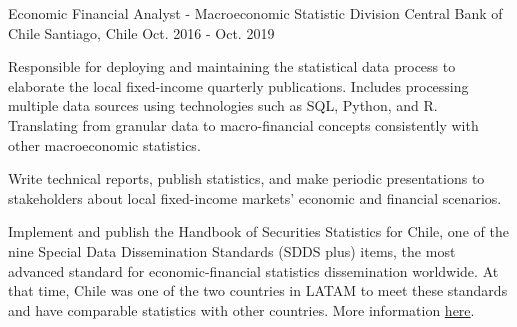\begin{cventries}
  \cventry
    {Economic Financial Analyst - Macroeconomic Statistic Division} %
    {Central Bank of Chile} %
    {Santiago, Chile} %
    {Oct. 2016 - Oct. 2019} %
    {
      \begin{cvitems} %
        \item {Responsible for deploying and maintaining the statistical data process to elaborate the local fixed-income quarterly publications. Includes processing multiple data sources using technologies such as SQL, Python, and R. Translating from granular data to macro-financial concepts consistently with other macroeconomic statistics.}
        \item {Write technical reports, publish statistics, and make periodic presentations to stakeholders about local fixed-income markets' economic and financial scenarios.}
        \item {Implement and publish the Handbook of Securities Statistics for Chile, one of the nine Special Data Dissemination Standards (SDDS plus) items, the most advanced standard for economic-financial statistics dissemination worldwide. At that time, Chile was one of the two countries in LATAM to meet these standards and have comparable statistics with other countries. More information \href{https://www.bcentral.cl/en/detail-news-and-publications/-/asset_publisher/Exzd7l9NC3Y6/content/id/2228947}{here}.}
      \end{cvitems}
    }

\end{cventries}
